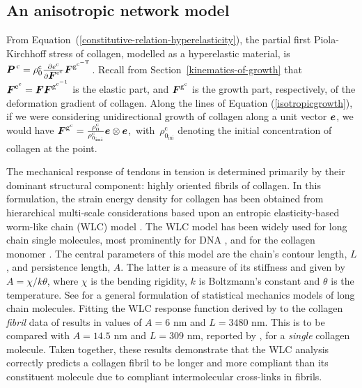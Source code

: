 \subsection{An anisotropic network model}
\label{anisotropic-network-elasticity}

From Equation~(\ref{constitutive-relation-hyperelasticity}), the
partial first Piola-Kirchhoff stress of collagen, modelled as a
hyperelastic material, is $\mbox{\boldmath$ P$}^{\,\mathrm{c}} = \rho_0^\mathrm{c}
\frac{\partial e^\mathrm{c}}{\partial\mbox{\boldmath$ F$}^{\mathrm{e}^\mathrm{c}}}
\mbox{\boldmath$ F$}^{\mathrm{g}^{\mathrm{c}^\mathrm{-T}}} $. Recall from
Section~\ref{kinematics-of-growth} that \mbox{$\bF^{\mathrm{e}%
    ^\mathrm{c}} = \bF\bF^{\mathrm{g}^{\mathrm{c}^{-1}}}$} is the
elastic part, and $\mbox{\boldmath$ F$}^{\mathrm{g}^\mathrm{c}}$ is the growth part,
respectively, of the deformation gradient of collagen. Along the lines
of Equation (\ref{isotropicgrowth}), if we were considering
unidirectional growth of collagen along a unit vector $\mbox{\boldmath$ e$}$, we would
have \mbox{$\mbox{\boldmath$ F$}^{\mathrm{g}^\mathrm{c}} = \frac{\rho^\mathrm{c}_{0}}
  {\rho^\mathrm{c}_{0_{\mathrm{ini}}}} \mbox{\boldmath$ e$} \otimes \mbox{\boldmath$ e$}$, with
  $\rho^\mathrm{c}_{0_{\mathrm{ini}}}$} denoting the initial
concentration of collagen at the point.

The mechanical response of tendons in tension is determined primarily
by their dominant structural component: highly oriented fibrils of
collagen. In this formulation, the strain energy density for collagen
has been obtained from hierarchical multi-scale considerations based
upon an entropic elasticity-based worm-like chain (WLC) model
\citep{KratkyPorod:49}. The WLC model has been widely used for long
chain single molecules, most prominently for DNA
\citep{MarkoSiggia:95,Riefetal:97,Bustamanteetal:2003}, and for the
collagen mono\-mer \citep{Sunetal:2002}. The central parameters of
this model are the chain's contour length, $L$, and persistence
length, $A$. The latter is a measure of its stiffness and given by $A
= \chi/k\theta$, where $\chi$ is the bending rigidity, $k$ is
Boltzmann's constant and $\theta$ is the temperature. See
\citet{LandLif} for a general formulation of statistical mechanics
models of long chain molecules. Fitting the WLC response function
derived by \citet{MarkoSiggia:95} to the collagen {\em fibril} data of
\citet{Grahametal:2004} results in values of $A = 6$ nm and $L = 3480$
nm. This is to be compared with $A=14.5$ nm and $L=309$ nm, reported
by \citet{Sunetal:2002}, for a {\em single} collagen molecule. Taken
together, these results demonstrate that the WLC analysis correctly
predicts a collagen fibril to be longer and more compliant than its
constituent molecule due to compliant intermolecular cross-links in
fibrils.

